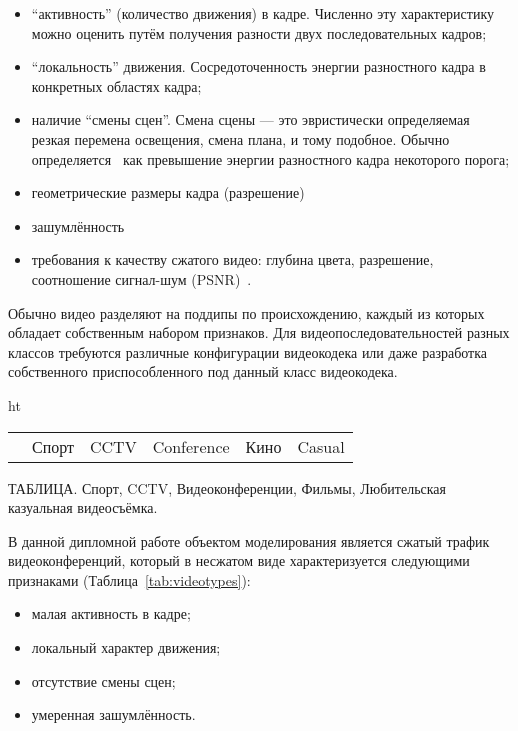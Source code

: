 \begin{itemize}
    \item ``активность'' (количество движения) в кадре. Численно 
        эту характеристику можно оценить путём получения разности
        двух последовательных кадров;
    \item ``локальность'' движения. Сосредоточенность энергии
        разностного кадра в конкретных областях кадра;
    \item наличие ``смены сцен''. Смена сцены --- это эвристически
        определяемая резкая перемена освещения, смена плана,
        и тому подобное. Обычно определяется~\cite{} как превышение
        энергии разностного кадра некоторого порога;
    \item геометрические размеры кадра (разрешение)
    \item зашумлённость
    \item требования к качеству сжатого видео: глубина цвета,
        разрешение, соотношение сигнал-шум (PSNR)~\cite{}.
\end{itemize}

Обычно видео разделяют на поддипы по происхождению,
каждый из которых обладает собственным набором признаков.
Для видеопоследовательностей разных классов требуются
различные конфигурации видеокодека или даже разработка
собственного приспособленного под данный класс видеокодека.

\begin{table}{ht}
    \centering
    \begin{tabular}{| c | c | c | c | c | c |}
        & Спорт & CCTV & Conference & Кино & Casual \\
    \end{tabular}
\end{table}
ТАБЛИЦА. Спорт, CCTV, Видеоконференции, Фильмы, Любительская
казуальная видеосъёмка.

В данной дипломной работе объектом моделирования является
сжатый трафик видеоконференций, который в несжатом виде
характеризуется следующими признаками (Таблица~\ref{tab:videotypes}):

\begin{itemize}
    \item малая активность в кадре;
    \item локальный характер движения;
    \item отсутствие смены сцен;
    \item умеренная зашумлённость.
\end{itemize}



